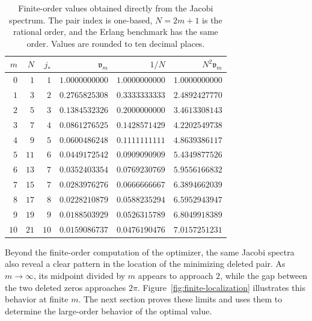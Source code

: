 \documentclass[11pt]{article}
\numberwithin{equation}{section}
\theoremstyle{definition}
\theoremstyle{remark}
\begin{document}
\begin{table}[h!]
\centering
\caption{Finite-order values obtained directly from the Jacobi
spectrum. The pair index is one-based, $N=2m+1$ is the rational order, and
the Erlang benchmark has the same order. Values are rounded to ten decimal
places.}
\label{tab:finite-values}
\small

\begin{tabular}{@{}rrrrrr@{}}
\toprule
$m$ & $N$ & $j_*$ & $\mathfrak v_m$ & $1/N$ & $N^2\mathfrak v_m$\\
\midrule
$0$  & $1$  & $1$  & $1.0000000000$ & $1.0000000000$ & $1.0000000000$\\
$1$  & $3$  & $2$  & $0.2765825308$ & $0.3333333333$ & $2.4892427770$\\
$2$  & $5$  & $3$  & $0.1384532326$ & $0.2000000000$ & $3.4613308143$\\
$3$  & $7$  & $4$  & $0.0861276525$ & $0.1428571429$ & $4.2202549738$\\
$4$  & $9$  & $5$  & $0.0600486248$ & $0.1111111111$ & $4.8639386117$\\
$5$  & $11$ & $6$  & $0.0449172542$ & $0.0909090909$ & $5.4349877526$\\
$6$  & $13$ & $7$  & $0.0352403354$ & $0.0769230769$ & $5.9556166832$\\
$7$  & $15$ & $7$  & $0.0283976276$ & $0.0666666667$ & $6.3894662039$\\
$8$  & $17$ & $8$  & $0.0228210879$ & $0.0588235294$ & $6.5952943947$\\
$9$  & $19$ & $9$  & $0.0188503929$ & $0.0526315789$ & $6.8049918389$\\
$10$ & $21$ & $10$ & $0.0159086737$ & $0.0476190476$ & $7.0157251231$\\
\bottomrule
\end{tabular}

\end{table}

Beyond the finite-order computation of the optimizer, the same Jacobi spectra
also reveal a clear pattern in the location of the minimizing deleted pair.
As $m\to\infty$, its midpoint divided by $m$ appears to approach $2$, while
the gap between the two deleted zeros approaches $2\pi$.
Figure~\ref{fig:finite-localization} illustrates this behavior at finite $m$. The next section proves these limits and uses them to determine
the large-order behavior of the optimal value.
\end{document}
